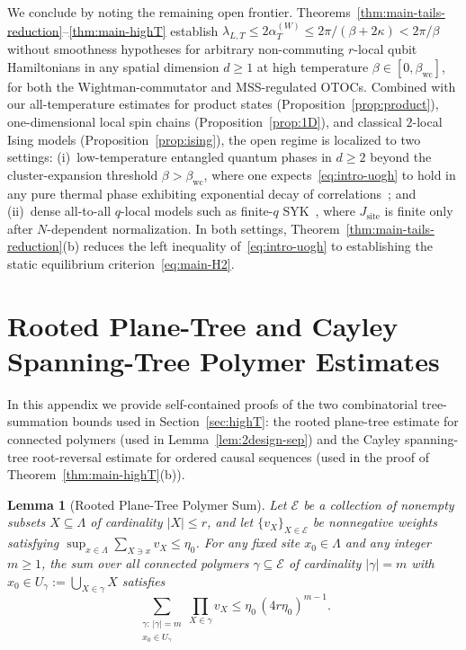 \documentclass[11pt,a4paper]{article}
\numberwithin{equation}{section}
\theoremstyle{plain}
\newtheorem{lemma}[theorem]{Lemma}
\theoremstyle{definition}
\begin{document}
We conclude by noting the remaining open frontier. Theorems~\ref{thm:main-tails-reduction}--\ref{thm:main-highT} establish $\lambda_{L,T}\le 2\alpha_T^{(W)}\le 2\pi/(\beta+2\kappa) < 2\pi/\beta$ without smoothness hypotheses for arbitrary non-commuting $r$-local qubit Hamiltonians in any spatial dimension $d\ge 1$ at high temperature $\beta\in[0,\beta_{\mathrm{wc}}]$, for both the Wightman-commutator and MSS-regulated OTOCs. Combined with our all-temperature estimates for product states (Proposition~\ref{prop:product}), one-dimensional local spin chains (Proposition~\ref{prop:1D}), and classical $2$-local Ising models (Proposition~\ref{prop:ising}), the open regime is localized to two settings: (i)~low-temperature entangled quantum phases in $d\ge 2$ beyond the cluster-expansion threshold $\beta > \beta_{\mathrm{wc}}$, where one expects~\eqref{eq:intro-uogh} to hold in any pure thermal phase exhibiting exponential decay of correlations~\cite{Kliesch2014,Frohlich2015,Kato2019,Kuwahara2020b,Alhambra2023,Rouze2026}; and (ii)~dense all-to-all $q$-local models such as finite-$q$ SYK~\cite{MS2016,Roberts2018,Qi2019,Yin2020,Garcia2025}, where $J_{\mathrm{site}}$ is finite only after $N$-dependent normalization. In both settings, Theorem~\ref{thm:main-tails-reduction}(b) reduces the left inequality of~\eqref{eq:intro-uogh} to establishing the static equilibrium criterion~\eqref{eq:main-H2}.

\appendix

\section{Rooted Plane-Tree and Cayley Spanning-Tree Polymer Estimates}\label{app:trees}

In this appendix we provide self-contained proofs of the two combinatorial tree-summation bounds used in Section~\ref{sec:highT}: the rooted plane-tree estimate for connected polymers (used in Lemma~\ref{lem:2design-sep}) and the Cayley spanning-tree root-reversal estimate for ordered causal sequences (used in the proof of Theorem~\ref{thm:main-highT}(b)).

\begin{lemma}[Rooted Plane-Tree Polymer Sum]\label{lem:app-planetree}
Let $\mathcal{E}$ be a collection of nonempty subsets $X\subseteq\Lambda$ of cardinality $|X|\le r$, and let $\{v_X\}_{X\in\mathcal{E}}$ be nonnegative weights satisfying $\sup_{x\in\Lambda}\sum_{X\ni x} v_X \le \eta_0$. For any fixed site $x_0\in\Lambda$ and any integer $m\ge 1$, the sum over all connected polymers $\gamma\subseteq\mathcal{E}$ of cardinality $|\gamma|=m$ with $x_0\in U_\gamma := \bigcup_{X\in\gamma} X$ satisfies
\begin{equation}\label{eq:app-planetree}
  \sum_{\substack{\gamma:\, |\gamma|=m \\ x_0\in U_\gamma}} \prod_{X\in\gamma} v_X
  \le \eta_0\,(4r\eta_0)^{m-1}.
\end{equation}
\end{lemma}
\end{document}
